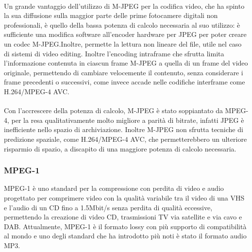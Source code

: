 			\paragraph*{}
			Un grande vantaggio dell'utilizzo di M-JPEG per la codifica video, che ha spinto la sua diffusione sulla maggior parte delle prime fotocamere digitali non professionali, è quello della bassa potenza di calcolo necessaria al suo utilizzo: è sufficiente una modifica software all'encoder hardware per \gls{JPEG} per poter creare un codec M-JPEG.\@ Inoltre, permette la lettura non lineare del file, utile nel caso di sistemi di video editing. Inoltre l'encoding intraframe che sfrutta limita l'informazione contenuta in ciascun frame M-JPEG a quella di un frame del video originale, permettendo di cambiare velocemente il contenuto, senza considerare i frame precedenti o successivi, come invece accade nelle codifiche interframe come H.264/MPEG-4 AVC.\@
			\paragraph*{}
			Con l'accrescere della potenza di calcolo, M-JPEG	è stato soppiantato da MPEG-4, per la resa qualitativamente molto migliore a parità di bitrate, infatti \gls{JPEG} è inefficiente nello spazio di archiviazione. Inoltre M-JPEG non sfrutta tecniche di predizione spaziale, come H.264/MPEG-4 AVC, che permetterebbero un ulteriore risparmio di spazio, a discapito di una maggiore potenza di calcolo necessaria.

		\subsubsection{MPEG-1}
			MPEG-1 è uno standard per la compressione con perdita di video e audio progettato per comprimere video con la qualità variabile tra il video di una \gls{VHS} e l'audio di un \gls{CD} fino a 1.5Mbit/s senza perdita di qualità eccessive, permettendo la creazione di video \gls{CD}, trasmissioni TV via satellite e via cavo e \gls{DAB}. Attualmente, MPEG-1 è il formato lossy con più supporto di compatibilità al mondo e uno degli standard che ha introdotto più noti è stato il formato audio MP3.
